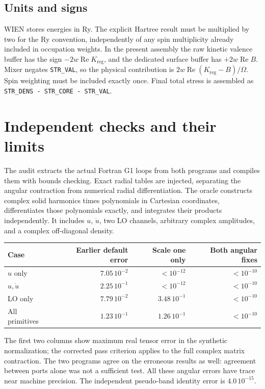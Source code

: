 \documentclass[11pt]{article}
\newcommand{\Rea}{\operatorname{Re}}
\begin{document}
\subsection{Units and signs}
WIEN stores energies in Ry. The explicit Hartree result must be multiplied by two for the Ry convention, independently of any spin multiplicity already included in occupation weights. In the present assembly the raw kinetic valence buffer has the sign $-2w\Rea K_{\mathrm{reg}}$, and the dedicated surface buffer has $+2w\Rea B$. Mixer negates \texttt{STR\_VAL}, so the physical contribution is $2w\Rea(K_{\mathrm{reg}}-B)/\Omega$. Spin weighting must be included exactly once. Final total stress is assembled as \texttt{STR\_DENS - STR\_CORE - STR\_VAL}.

\section{Independent checks and their limits}
The audit extracts the actual Fortran G1 loops from both programs and compiles them with bounds checking. Exact radial tables are injected, separating the angular contraction from numerical radial differentiation. The oracle constructs complex solid harmonics times polynomials in Cartesian coordinates, differentiates those polynomials exactly, and integrates their products independently. It includes $u$, $\dot u$, two LO channels, arbitrary complex amplitudes, and a complex off-diagonal density.

\begin{center}\small
\begin{tabular}{lrrr}\toprule
Case & Earlier default error & Scale one only & Both angular fixes\\\midrule
$u$ only & $7.05\,10^{-2}$ & $<10^{-12}$ & $<10^{-10}$\\
$u,\dot u$ & $2.25\,10^{-1}$ & $<10^{-12}$ & $<10^{-10}$\\
LO only & $7.79\,10^{-2}$ & $3.48\,10^{-1}$ & $<10^{-10}$\\
All primitives & $1.23\,10^{-1}$ & $1.26\,10^{-1}$ & $<10^{-10}$\\\bottomrule
\end{tabular}
\end{center}
The first two columns show maximum real tensor error in the synthetic normalization; the corrected pass criterion applies to the full complex matrix contraction. The two programs agree on the erroneous results as well: agreement between ports alone was not a sufficient test. All these angular errors have trace near machine precision. The independent pseudo-band identity error is $4.0\,10^{-15}$.
\end{document}
